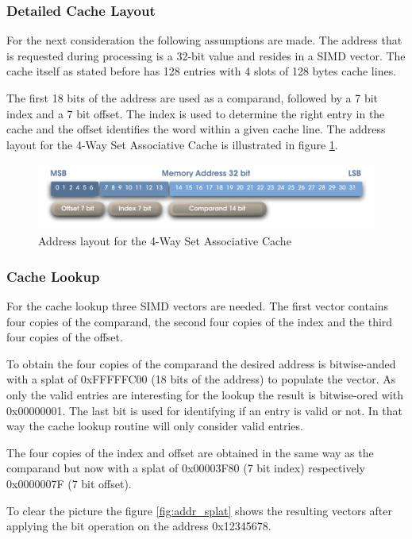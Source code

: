 \documentclass[DIV10, abstracton, openright, footsepline, headsepline, twoside, 9pt,
bigheadings]{scrreprt}
\begin{document}
\subsubsection{Detailed Cache Layout}
For the next consideration the following assumptions are made. The address that is
requested during processing is a 32-bit value and resides in a SIMD vector. The cache
 itself as stated before has
128 entries with 4 slots of 128 bytes cache lines.

The first 18 bits of the address are used as a comparand, followed by a 7 bit index
and a 7 bit  offset. The index is used to determine the right entry in the cache
 and the offset identifies the word within a given cache line. The address layout
for the 4-Way Set Associative Cache is illustrated in figure
 \ref{fig:4way_address_layout}.

\begin{figure}[H]
\centering
\includegraphics[width=\textwidth]{diagramme/addsplit_cache}
\caption{Address layout for the 4-Way Set Associative Cache}
\label{fig:4way_address_layout}
\end{figure}


\subsubsection{Cache Lookup}
For the cache lookup three SIMD vectors are needed. The first vector contains
four copies of the comparand, the second four copies of the index and the third
four copies of the offset.

To obtain the four copies of the comparand the desired address is bitwise-anded
with a splat of 0xFFFFFC00 (18 bits of the address) to populate the vector.
As only the valid entries are interesting for the lookup the result is bitwise-ored
with 0x00000001. The last bit is used for identifying if an entry is valid or not.
In that way the cache lookup routine will only consider valid entries.

The four copies of the index and offset are obtained in the same way as the
comparand but now with a splat of 0x00003F80 (7 bit index) respectively
0x0000007F (7 bit offset).

To clear the picture the figure \ref{fig:addr_splat} shows the resulting
vectors after applying the bit operation on the address 0x12345678.
\end{document}
